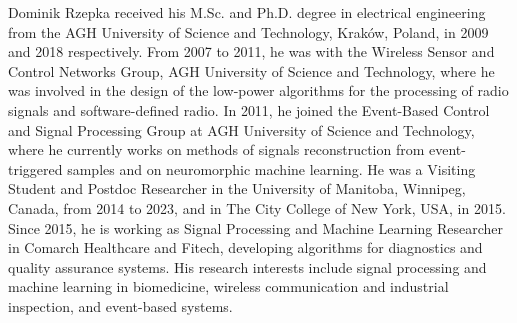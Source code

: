 \documentclass[lettersize,journal,onecolumn]{IEEEtran}
\theoremstyle{definition}
\begin{document}
\begin{IEEEbiography}
	{Dominik Rzepka} received his M.Sc. and Ph.D. degree in
	electrical engineering from the AGH University of
	Science and Technology, Kraków, Poland, in 2009 and 2018 respectively. From 2007 to
	2011, he was with the Wireless Sensor and Control
	Networks Group, AGH University of Science and
	Technology, where he was involved in the design
	of the low-power algorithms for the processing of
	radio signals and software-defined radio. In 2011,
	he joined the Event-Based Control and Signal Processing Group at AGH
	University of Science and Technology, where he currently works on methods of signals reconstruction from event-triggered samples and on neuromorphic machine learning. He was
	a Visiting Student and Postdoc Researcher in the University of Manitoba, Winnipeg,
	Canada, from 2014 to 2023, and in The City College of New York, USA,
	in 2015. Since 2015, he is working as Signal Processing and Machine Learning Researcher in
	Comarch Healthcare and Fitech, developing algorithms for diagnostics and quality assurance systems. His research interests include
	signal processing and machine learning in biomedicine, wireless communication and industrial inspection, and event-based systems.
\end{IEEEbiography}
\end{document}
